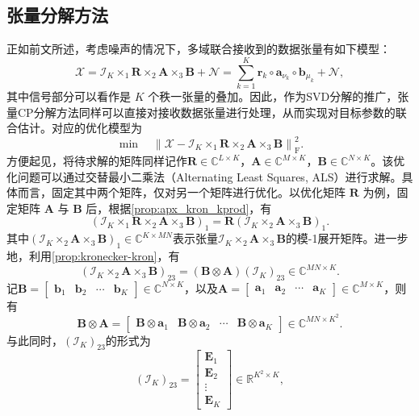 \subsection{张量分解方法}
正如前文所述，考虑噪声的情况下，多域联合接收到的数据张量有如下模型：
\[
    \mathcal{X} = \mathcal{I}_{K} \times_1 \mathbf{R} \times_2 \mathbf{A} \times_3 \mathbf{B} + \mathcal{N} = \sum_{k=1}^K \bm{r}_k \circ \bm{a}_{\nu_k} \circ \bm{b}_{\mu_k} + \mathcal{N},
\]
其中信号部分可以看作是 \( K \) 个秩一张量的叠加。因此，作为SVD分解的推广，张量CP分解方法同样可以直接对接收数据张量进行处理，从而实现对目标参数的联合估计。对应的优化模型为
\[
    \min \quad \left\| \mathcal{X} - \mathcal{I}_K \times_1 \mathbf{R} \times_2 \mathbf{A} \times_3 \mathbf{B} \right\|_{\mathrm{F}}^2.
\]
方便起见，将待求解的矩阵同样记作\( \mathbf{R} \in \mathbb{C}^{L \times K} \)，\( \mathbf{A} \in \mathbb{C}^{M \times K} \)，\( \mathbf{B} \in \mathbb{C}^{N \times K} \)。该优化问题可以通过交替最小二乘法（Alternating Least Squares, ALS）进行求解。具体而言，固定其中两个矩阵，仅对另一个矩阵进行优化。以优化矩阵 \( \mathbf{R} \) 为例，固定矩阵 \( \mathbf{A} \) 与 \( \mathbf{B} \) 后，根据\cref{prop:apx_kron_kprod}，有
\[
    (\mathcal{I}_K \times_1 \mathbf{R} \times_2 \mathbf{A} \times_3 \mathbf{B})_1 = \mathbf{R} (\mathcal{I}_K \times_2 \mathbf{A} \times_3 \mathbf{B})_1.
\]
其中\( (\mathcal{I}_K \times_2 \mathbf{A} \times_3 \mathbf{B})_1 \in \mathbb{C}^{K \times M N} \)表示张量\( \mathcal{I}_K \times_2 \mathbf{A} \times_3 \mathbf{B} \)的模-1展开矩阵。进一步地，利用\cref{prop:kronecker-kron}，有
\[
    (\mathcal{I}_K \times_2 \mathbf{A} \times_3 \mathbf{B})_{23} =  (\mathbf{B} \otimes \mathbf{A}) (\mathcal{I}_K)_{23} \in \mathbb{C}^{M N \times K}.
\]
记\( \mathbf{B} = \begin{bmatrix} \bm{b}_1 & \bm{b}_2 & \cdots & \bm{b}_K \end{bmatrix} \in \mathbb{C}^{N \times K} \)，以及\( \mathbf{A} = \begin{bmatrix} \bm{a}_1 & \bm{a}_2 & \cdots & \bm{a}_K \end{bmatrix} \in \mathbb{C}^{M \times K} \)，则有
\[
    \mathbf{B} \otimes \mathbf{A} = \begin{bmatrix}
        \mathbf{B} \otimes \bm{a}_1 & \mathbf{B} \otimes \bm{a}_2 & \cdots & \mathbf{B} \otimes \bm{a}_K
    \end{bmatrix} \in \mathbb{C}^{M N \times K^2}.
\]
与此同时，\( (\mathcal{I}_K)_{23} \)的形式为
\[
    (\mathcal{I}_K)_{23} = \begin{bmatrix}
        \mathbf{E}_1 \\ \mathbf{E}_2  \\ \vdots \\ \mathbf{E}_K
    \end{bmatrix} \in \mathbb{R}^{K^2 \times K},
\]
